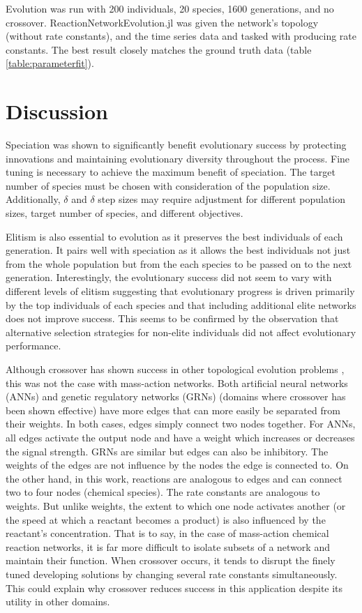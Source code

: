 \documentclass[12pt]{report}
\begin{document}
Evolution was run with 200 individuals, 20 species, 1600 generations, and no crossover. ReactionNetworkEvolution.jl was given the network's topology (without rate constants), and the time series data and tasked with producing rate constants. The best result closely matches the ground truth data (table \ref{table:parameterfit}).

\section{Discussion}
Speciation was shown to significantly benefit evolutionary success by protecting innovations and maintaining evolutionary diversity throughout the process. Fine tuning is necessary to achieve the maximum benefit of speciation. The target number of species must be chosen with consideration of the population size. Additionally, $\delta$ and $\delta$ step sizes may require adjustment for different population sizes, target number of species, and different objectives. 

Elitism is also essential to evolution as it preserves the best individuals of each generation. It pairs well with speciation as it allows the best individuals not just from the whole population but from the each species to be passed on to the next generation. Interestingly, the evolutionary success did not seem to vary with different levels of elitism suggesting that evolutionary progress is driven primarily by the top individuals of each species and that including additional elite networks does not improve success. This seems to be confirmed by the observation that alternative selection strategies for non-elite individuals did not affect evolutionary performance.

Although crossover has shown success in other topological evolution problems \cite{stanley_evolving_2002, dinh_effective_2015}, this was not the case with mass-action networks. Both artificial neural networks (ANNs) and genetic regulatory networks (GRNs) (domains where crossover has been shown effective) have more edges that can more easily be separated from their weights. In both cases, edges simply connect two nodes together. For ANNs, all edges activate the output node and have a weight which increases or decreases the signal strength. GRNs are similar but edges can also be inhibitory. The weights of the edges are not influence by the nodes the edge is connected to. On the other hand, in this work, reactions are analogous to edges and can connect two to four nodes (chemical species). The rate constants are analogous to weights. But unlike weights, the extent to which one node activates another (or the speed at which a reactant becomes a product) is also influenced by the reactant's concentration. That is to say, in the case of mass-action chemical reaction networks, it is far more difficult to isolate subsets of a network and maintain their function. When crossover occurs, it tends to disrupt the finely tuned developing solutions by changing several rate constants simultaneously. This could explain why crossover reduces success in this application despite its utility in other domains. 
\end{document}
